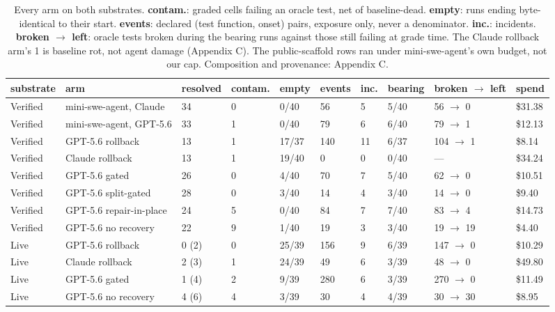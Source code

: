 \documentclass{article}
\begin{document}
\begin{table}[t]\caption{Every arm on both substrates. \textbf{contam.}: graded cells failing an oracle test, net of baseline-dead. \textbf{empty}: runs ending byte-identical to their start. \textbf{events}: declared (test function, onset) pairs, exposure only, never a denominator. \textbf{inc.}: incidents. \textbf{broken $\rightarrow$ left}: oracle tests broken during the bearing runs against those still failing at grade time. The Claude rollback arm's 1 is baseline rot, not agent damage (Appendix C). The public-scaffold rows ran under mini-swe-agent's own budget, not our cap. Composition and provenance: Appendix C.}\label{tab:every-arm-on-both-substr}
\centering\scriptsize\setlength{\aboverulesep}{0pt}\setlength{\belowrulesep}{0pt}\renewcommand{\arraystretch}{0.86}\setlength{\tabcolsep}{4pt}\begin{tabular}{llllllllll}
\toprule
substrate & arm & resolved & contam. & empty & events & inc. & bearing & broken $\rightarrow$ left & spend \\
\midrule
Verified & mini-swe-agent, Claude & 34 & 0 & 0/40 & 56 & 5 & 5/40 & 56 $\rightarrow$ 0 & \$31.38 \\
Verified & mini-swe-agent, GPT-5.6 & 33 & 1 & 0/40 & 79 & 6 & 6/40 & 79 $\rightarrow$ 1 & \$12.13 \\
Verified & GPT-5.6 rollback & 13 & 1 & 17/37 & 140 & 11 & 6/37 & 104 $\rightarrow$ 1 & \$8.14 \\
Verified & Claude rollback & 13 & 1 & 19/40 & 0 & 0 & 0/40 & --- & \$34.24 \\
Verified & GPT-5.6 gated & 26 & 0 & 4/40 & 70 & 7 & 5/40 & 62 $\rightarrow$ 0 & \$10.51 \\
Verified & GPT-5.6 split-gated & 28 & 0 & 3/40 & 14 & 4 & 3/40 & 14 $\rightarrow$ 0 & \$9.40 \\
Verified & GPT-5.6 repair-in-place & 24 & 5 & 0/40 & 84 & 7 & 7/40 & 83 $\rightarrow$ 4 & \$14.73 \\
Verified & GPT-5.6 no recovery & 22 & 9 & 1/40 & 19 & 3 & 3/40 & 19 $\rightarrow$ 19 & \$4.40 \\
Live & GPT-5.6 rollback & 0 (2) & 0 & 25/39 & 156 & 9 & 6/39 & 147 $\rightarrow$ 0 & \$10.29 \\
Live & Claude rollback & 2 (3) & 1 & 24/39 & 49 & 6 & 3/39 & 48 $\rightarrow$ 0 & \$49.80 \\
Live & GPT-5.6 gated & 1 (4) & 2 & 9/39 & 280 & 6 & 3/39 & 270 $\rightarrow$ 0 & \$11.49 \\
Live & GPT-5.6 no recovery & 4 (6) & 4 & 3/39 & 30 & 4 & 4/39 & 30 $\rightarrow$ 30 & \$8.95 \\
\bottomrule
\end{tabular}
\end{table}
\end{document}
